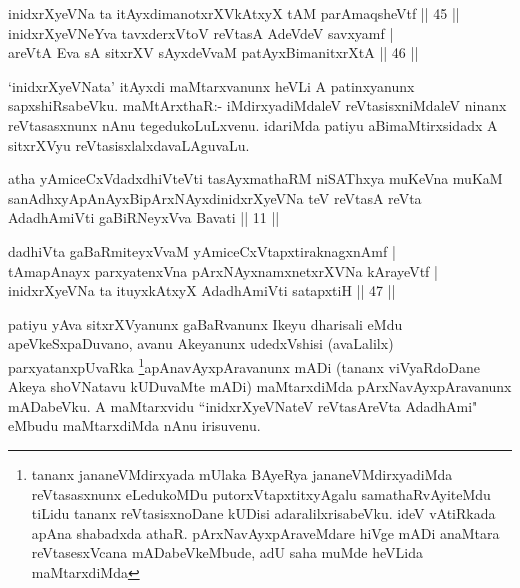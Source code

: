 \begin{shl}
inidxrXyeVNa ta itAyxdimanotxrXVkAtxyX tAM parAmaqsheVtf \hfill|| 45 || \\
\footnotemark[1]inidxrXyeVNeYva tavxderxVtoV reVtasA AdeVdeV savxyamf | \\
areVtA Eva sA sitxrXV sAyxdeVvaM patAyx\s BimanitxrXtA \hfill|| 46 || 
\end{shl}

\begin{artha}
`inidxrXyeVNata' itAyxdi maMtarxvanunx heVLi A patinxyanunx sapxshiRsabeVku. 
\break maMtArxthaR:- iMdirxyadiMdaleV reVtasisxniMdaleV ninanx reVtasasxnunx 
nAnu tegedu\-koLuLxvenu. idariMda patiyu aBimaMtirxsidadx A sitxrXVyu 
reVtasisxlalxdavaLAguvaLu.
\end{artha}


\begin{shl}
atha yAmiceCxVdadxdhiVteVti tasAyxmathaRM niSAThxya muKeVna muKaM sanAdhxyApAnAyxBipArxNAyxdinidxrXyeVNa teV reVtasA reVta AdadhAmiVti gaBiRNeyxVva Bavati || 11 ||
\end{shl}


\begin{shl}
dadhiVta gaBaRmiteyxVvaM yAmiceCxVtapxtiraknagxnAmf | \\
tAmapAnayx parxyatenxVna pArxNAyxnamxnetxrXVNa kArayeVtf | \\
inidxrXyeVNa ta ituyxkAtxyX AdadhAmiVti satapxtiH \hfill|| 47 || 
\end{shl}

\begin{artha}
patiyu yAva sitxrXVyanunx gaBaRvanunx Ikeyu dharisali eMdu 
apeVkeSxpaDu\-vano, avanu Akeyanunx udedxVshisi (avaLalilx) 
parxyatanxpUvaRka \footnote[2]{tananx jananeVMdirxyada mUlaka BAyeRya 
jananeVMdirxyadiMda reVtasasxnunx eLedukoMDu putorxVtapxtitxyAgalu 
samathaRvAyiteMdu tiLidu tananx reVtasisxnoDane kUDisi 
adaralilxrisabeVku. ideV vAtiRkada apAna shabadxda athaR. 
pArxNavAyxpAraveMdare hiVge mADi anaMtara reVtasesxVcana 
mADabeVkeMbude, adU saha muMde heVLida maMtarxdiMda}apAnavAyxpAra\-vanunx mADi (tananx 
viVyaRdoDane Akeya shoVNatavu kUDuvaMte mADi) maMtarxdiMda 
pArxNavAyxpAravanunx mADabeVku. A maMtarxvidu ``inidxrXyeVNateV reVtasAreVta AdadhAmi" eMbudu 
maMtarxdiMda nAnu irisuvenu.
\end{artha}

